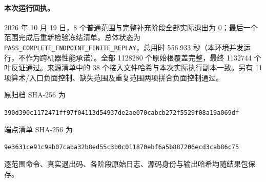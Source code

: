 \paragraph{本次运行回执。} 2026 年 10 月 19 日，8 个普通范围与完整补充阶段全部实际退出为 0；最后一个范围完成后重新检验冻结清单。总体状态为\texttt{PASS\_COMPLETE\_ENDPOINT\_FINITE\_REPLAY}，总用时 556.933 秒（本环境并发运行，不作为跨机器性能承诺）。全部 1128280 个原始根覆盖完整，最终 1132744 个叶反证通过。来源清单中的 38 个接入文件哈希与本次实际执行副本一致。另有 11 项算术/入口负面控制、缺失范围及重复范围两项拼合负面控制通过。

\noindent\begin{minipage}{\linewidth}
原归档 SHA-256 为
\begin{center}\scriptsize\texttt{390d390c1172471ff97f04113d54937de2ae070cabcb272f5529f08a19a069df}\end{center}
端点清单 SHA-256 为
\begin{center}\scriptsize\texttt{9e3631ce91c9ab07caba32b8ed55c3b0c011870ebf6a5b887206ecd3cab86c75}\end{center}
\end{minipage}\par\medskip

逐范围命令、真实退出码、各阶段原始日志、源码身份与输出哈希均随结果包保存。
